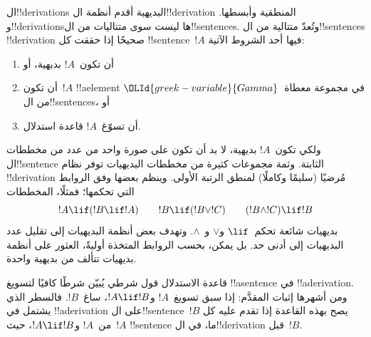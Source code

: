 \documentclass[../../../include/open-logic-section]{subfiles}
\begin{document}
      {}
      {}


ال!!{derivation}s البديهية أقدم أنظمة ال!!{derivation} المنطقية
وأبسطها. و!!{derivation}sها ليست سوى متتاليات من ال!!{sentence}s.
وتُعدّ متتالية من ال!!{sentence}s !!{derivation} صحيحًا إذا حققت كل
!!{sentence}~$!A$ فيها أحد الشروط الآتية:
\begin{enumerate}
\item أن تكون~$!A$ بديهية، أو
\item أن تكون~$!A$ !!a{element} في مجموعة معطاة~${\OLId{greek-variable}{Gamma}}$ من
  ال!!{sentence}s، أو
\item أن تسوّغ~$!A$ قاعدة استدلال.
\end{enumerate}
ولكي تكون~$!A$ بديهية، لا بد أن تكون على صورة واحد من عدد من مخططات
ال!!{sentence} الثابتة. وثمة مجموعات كثيرة من مخططات البديهيات توفر
نظام !!{derivation} مُرضيًا (سليمًا وكاملًا) لمنطق الرتبة الأولى.
وينظم بعضها وفق الروابط التي تحكمها؛ فمثلًا، المخططات
\[
!A \lif (!B \lif !A) \qquad !B \lif (!B \lor !C) \qquad (!B \land !C) \lif !B
\]
بديهيات شائعة تحكم~$\lif$ و$\lor$ و~$\land$. وتهدف بعض أنظمة
البديهيات إلى تقليل عدد البديهيات إلى أدنى حد. بل يمكن، بحسب الروابط
المتخذة أوليةً، العثور على أنظمة بديهيات تتألف من بديهية واحدة.

قاعدة الاستدلال قول شرطي يُبيّن شرطًا كافيًا لتسويغ
!!a{sentence} في !!a{derivation}. ومن أشهرها إثبات المقدَّم:
إذا سبق تسويغ~$!A$ و$!A \lif !B$، ساغ~$!B$.
فالسطر الذي يشتمل في !!a{derivation} على ال!!{sentence}~$!B$
يصح بهذه القاعدة إذا تقدم عليه كل من~$!A$ و$!A \lif !B$،
حيث~$!A$ !!{sentence} ما، في ال!!{derivation} قبل~$!B$.
\end{document}
